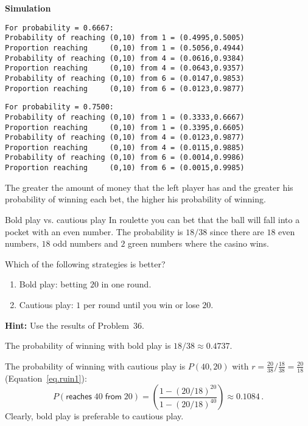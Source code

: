 \textbf{Simulation}
\begin{verbatim}
For probability = 0.6667:
Probability of reaching (0,10) from 1 = (0.4995,0.5005)
Proportion reaching     (0,10) from 1 = (0.5056,0.4944)
Probability of reaching (0,10) from 4 = (0.0616,0.9384)
Proportion reaching     (0,10) from 4 = (0.0643,0.9357)
Probability of reaching (0,10) from 6 = (0.0147,0.9853)
Proportion reaching     (0,10) from 6 = (0.0123,0.9877)
\end{verbatim}

\begin{verbatim}
For probability = 0.7500:
Probability of reaching (0,10) from 1 = (0.3333,0.6667)
Proportion reaching     (0,10) from 1 = (0.3395,0.6605)
Probability of reaching (0,10) from 4 = (0.0123,0.9877)
Proportion reaching     (0,10) from 4 = (0.0115,0.9885)
Probability of reaching (0,10) from 6 = (0.0014,0.9986)
Proportion reaching     (0,10) from 6 = (0.0015,0.9985)
\end{verbatim}
The greater the amount of money that the left player has and the greater his probability of winning each bet, the higher his probability of winning.


\begin{prob}{Bold play vs. cautious play}
In roulette you can bet that the ball will fall into a pocket with an even number. The probability is $18/38$ since there are $18$ even numbers, $18$ odd numbers and $2$ green numbers where the casino wins.

Which of the following strategies is better?
\begin{enumerate}
\item Bold play: betting $20$ in one round.
\item Cautious play: $1$ per round until you win or lose $20$.
\end{enumerate}
\textbf{Hint:} Use the results of Problem~36.
\end{prob}

\solution{}

The probability of winning with bold play is $18/38\approx 0.4737$.

The probability of winning with cautious play is $P(40,20)$ with $r=\frac{20}{38}/\frac{18}{38}=\frac{20}{18}$ (Equation~\ref{eq.ruin1}):
\[
P(\textsf{reaches}\;40\;\textsf{from}\;20) =
\left(\frac{1-(20/18)^{20}}{1-(20/18)^{40}}\right)\approx 0.1084\,.
\]
Clearly, bold play is preferable to cautious play.

